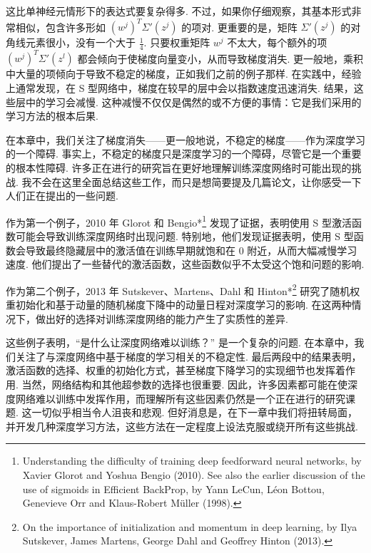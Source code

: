 这比单神经元情形下的表达式要复杂得多. 不过，如果你仔细观察，其基本形式非常相似，包含许多形如 $(w^j)^T \Sigma'(z^j)$ 的项对. 更重要的是，矩阵 $\Sigma'(z^j)$ 的对角线元素很小，没有一个大于 $\frac{1}{4}$. 只要权重矩阵 $w^j$ 不太大，每个额外的项 $(w^j)^T \Sigma'(z^l)$ 都会倾向于使梯度向量变小，从而导致梯度消失. 更一般地，乘积中大量的项倾向于导致不稳定的梯度，正如我们之前的例子那样. 在实践中，经验上通常发现，在 S 型网络中，梯度在较早的层中会以指数速度迅速消失. 结果，这些层中的学习会减慢. 这种减慢不仅仅是偶然的或不方便的事情：它是我们采用的学习方法的根本后果.

在本章中，我们关注了梯度消失——更一般地说，不稳定的梯度——作为深度学习的一个障碍. 事实上，不稳定的梯度只是深度学习的一个障碍，尽管它是一个重要的根本性障碍. 许多正在进行的研究旨在更好地理解训练深度网络时可能出现的挑战. 我不会在这里全面总结这些工作，而只是想简要提及几篇论文，让你感受一下人们正在提出的一些问题.

作为第一个例子，2010 年 Glorot 和 Bengio*\footnote{Understanding the difficulty of training deep feedforward neural networks, by Xavier Glorot and Yoshua Bengio (2010). See also the earlier discussion of the use of sigmoids in Efficient BackProp, by Yann LeCun, Léon Bottou, Genevieve Orr and Klaus-Robert Müller (1998).} 发现了证据，表明使用 S 型激活函数可能会导致训练深度网络时出现问题. 特别地，他们发现证据表明，使用 S 型函数会导致最终隐藏层中的激活值在训练早期就饱和在 $0$ 附近，从而大幅减慢学习速度. 他们提出了一些替代的激活函数，这些函数似乎不太受这个饱和问题的影响.

作为第二个例子，2013 年 Sutskever、Martens、Dahl 和 Hinton*\footnote{On the importance of initialization and momentum in deep learning, by Ilya Sutskever, James Martens, George Dahl and Geoffrey Hinton (2013).} 研究了随机权重初始化和基于动量的随机梯度下降中的动量日程对深度学习的影响. 在这两种情况下，做出好的选择对训练深度网络的能力产生了实质性的差异.

这些例子表明，``是什么让深度网络难以训练？'' 是一个复杂的问题. 在本章中，我们关注了与深度网络中基于梯度的学习相关的不稳定性. 最后两段中的结果表明，激活函数的选择、权重的初始化方式，甚至梯度下降学习的实现细节也发挥着作用. 当然，网络结构和其他超参数的选择也很重要. 因此，许多因素都可能在使深度网络难以训练中发挥作用，而理解所有这些因素仍然是一个正在进行的研究课题. 这一切似乎相当令人沮丧和悲观. 但好消息是，在下一章中我们将扭转局面，并开发几种深度学习方法，这些方法在一定程度上设法克服或绕开所有这些挑战.
